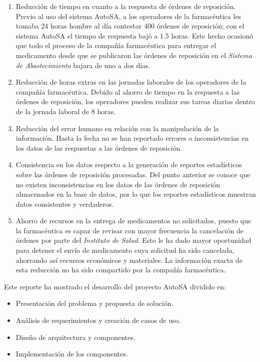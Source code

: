 \begin{enumerate}
	\item Reducción de tiempo en cuanto a la respuesta de órdenes de reposición. Previo al uso del sistema AutoSA, a los operadores de la farmacéutica les tomaba 24 horas hombre al día contestar 400 órdenes de reposición; con el sistema AutoSA el tiempo de respuesta bajó a 1.5 horas. Este hecho ocasionó que todo el proceso de la compañía farmacéutica para entregar el medicamento desde que se publicaron las órdenes de reposición en el \textit{Sistema de Abastecimiento} bajara de uno a dos días.
	\item Reducción de horas extras en las jornadas laborales de los operadores de la compañía farmacéutica. Debido al ahorro de tiempo en la respuesta a las órdenes de reposición, los operadores pueden realizar sus tareas diarias dentro de la jornada laboral de 8 horas.
	\item Reducción del error humano en relación con la manipulación de la información. Hasta la fecha no se han reportado errores o inconsistencias en los datos de las respuestas a las órdenes de reposición.
	\item Consistencia en los datos respecto a la generación de reportes estadísticos sobre las órdenes de reposición procesadas. Del punto anterior se conoce que no existen inconsistencias en los datos de las órdenes de reposición almacenados en la base de datos, por lo que los reportes estadísticos muestran datos consistentes y verdaderos.
	\item Ahorro de recursos en la entrega de medicamentos no solicitados, puesto que la farmacéutica es capaz de revisar con mayor frecuencia la cancelación de órdenes por parte del \textit{Instituto de Salud}. Esto le ha dado mayor oportunidad para detener el envío de medicamento cuya solicitud ha sido cancelada, ahorrando así recursos económicos y materiales. La información exacta de esta reducción no ha sido compartido por la compañía farmacéutica.
\end{enumerate}
Este reporte ha mostrado el desarrollo del proyecto AutoSA dividido en:
\begin{itemize}
	\item Presentación del problema y propuesta de solución. 
	\item Análisis de requerimientos y creación de casos de uso.
	\item Diseño de arquitectura y componentes.
	\item Implementación de los componentes.
\end{itemize}
